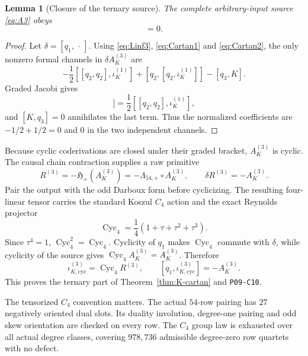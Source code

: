 \documentclass[11pt]{article}
\newtheorem{lemma}[theorem]{Lemma}
\theoremstyle{definition}
\theoremstyle{remark}
\newcommand{\Cyc}{\operatorname{Cyc}}
\newcommand{\claimid}[1]{\texttt{#1}}
\begin{document}
\begin{lemma}[Closure of the ternary source]\label{lem:A3closed}
The complete arbitrary-input source \eqref{eq:A3} obeys
\begin{equation}
 [q_1,A_K^{(3)}]=0.
\end{equation}
\end{lemma}

\begin{proof}
Let $\delta=[q_1,\,\cdot\,]$.  Using \eqref{eq:Linf3},
\eqref{eq:Cartan1} and \eqref{eq:Cartan2}, the only nonzero formal channels
in $\delta A_K^{(3)}$ are
\begin{equation}\label{eq:closure-channels}
 -\frac12[[q_2,q_2],\iota_K^{(1)}]
 +[q_2,[q_2,\iota_K^{(1)}]]-[q_3,K].
\end{equation}
Graded Jacobi gives
\begin{equation}
 [q_2,[q_2,\iota_K^{(1)}]]
 =\frac12[[q_2,q_2],\iota_K^{(1)}],
\end{equation}
and $[K,q_3]=0$ annihilates the last term.  Thus the normalized coefficients
are $-1/2+1/2=0$ and $0$ in the two independent channels.
\end{proof}

Because cyclic coderivations are closed under their graded bracket,
$A_K^{(3)}$ is cyclic.  The causal chain contraction supplies a raw
primitive
\begin{equation}\label{eq:raw3}
 R^{(3)}=-\mathfrak H_+(A_K^{(3)})
 =-\Lambda_{54,+}\circ A_K^{(3)},
 \qquad \delta R^{(3)}=-A_K^{(3)}.
\end{equation}
Pair the output with the odd Darboux form before cyclicizing.  The resulting
four-linear tensor carries the standard Koszul $C_4$ action and the exact
Reynolds projector
\begin{equation}\label{eq:Cyc4}
 \Cyc_4=\frac14(1+\tau+\tau^2+\tau^3).
\end{equation}
Since $\tau^4=1$, $\Cyc_4^2=\Cyc_4$.  Cyclicity of $q_1$ makes $\Cyc_4$
commute with $\delta$, while cyclicity of the source gives
$\Cyc_4A_K^{(3)}=A_K^{(3)}$.  Therefore
\begin{equation}\label{eq:Cartan3}
 \iota_{K,\mathrm{cyc}}^{(3)}=\Cyc_4R^{(3)},
 \qquad
 [q_1,\iota_{K,\mathrm{cyc}}^{(3)}]=-A_K^{(3)}.
\end{equation}
This proves the ternary part of Theorem~\ref{thm:K-cartan} and
\claimid{P09-C10}.

The tensorized $C_4$ convention matters.  The actual $54$-row pairing has
$27$ negatively oriented dual slots.  Its duality involution, degree-one
pairing and odd skew orientation are checked on every row.  The $C_4$ group
law is exhausted over all actual degree classes, covering $978{,}736$
admissible degree-zero row quartets with no defect.
\end{document}
